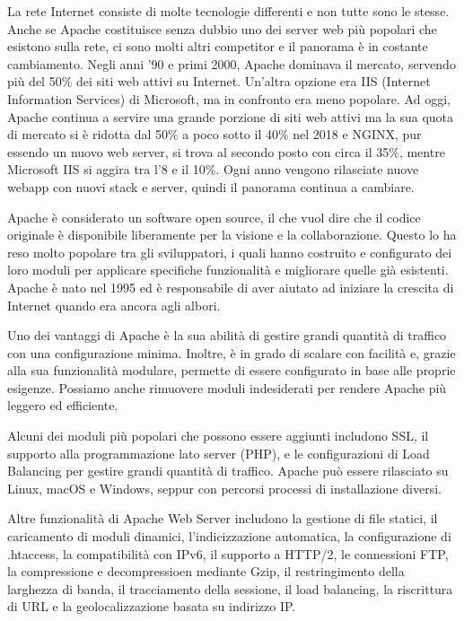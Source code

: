 La rete Internet consiste di molte tecnologie differenti e non tutte sono le stesse. Anche se Apache costituisce senza dubbio uno dei server web più popolari che esistono sulla rete, ci sono molti altri competitor e il panorama è in costante cambiamento. Negli anni '90 e primi 2000, Apache dominava il mercato, servendo più del 50\% dei siti web attivi su Internet. Un'altra opzione era IIS (Internet Information Services) di Microsoft, ma in confronto era meno popolare. Ad oggi, Apache continua a servire una grande porzione di siti web attivi ma la sua quota di mercato si è ridotta dal 50\% a poco sotto il 40\% nel 2018 e NGINX, pur essendo un nuovo web server, si trova al secondo posto con circa il 35\%, mentre Microsoft IIS si aggira tra l'8 e il 10\%. Ogni anno vengono rilasciate nuove webapp con nuovi stack e server, quindi il panorama continua a cambiare.

Apache è considerato un software open source, il che vuol dire che il codice originale è disponibile liberamente per la visione e la collaborazione. Questo lo ha reso molto popolare tra gli sviluppatori, i quali hanno costruito e configurato dei loro moduli per applicare specifiche funzionalità e migliorare quelle già esistenti. Apache è nato nel 1995 ed è responsabile di aver aiutato ad iniziare la crescita di Internet quando era ancora agli albori.

Uno dei vantaggi di Apache è la sua abilità di gestire grandi quantità di traffico con una configurazione minima. Inoltre, è in grado di scalare con facilità e, grazie alla sua funzionalità modulare, permette di essere configurato in base alle proprie esigenze. Possiamo anche rimuovere moduli indesiderati per rendere Apache più leggero ed efficiente.

Alcuni dei moduli più popolari che possono essere aggiunti includono SSL, il supporto alla programmazione lato server (PHP), e le configurazioni di Load Balancing per gestire grandi quantità di traffico. Apache può essere rilasciato su Linux, macOS e Windows, seppur con percorsi processi di installazione diversi.

Altre funzionalità di Apache Web Server includono la gestione di file statici, il caricamento di moduli dinamici, l'indicizzazione automatica, la configurazione di .htaccess, la compatibilità con IPv6, il supporto a HTTP/2, le connessioni FTP, la compressione e decompressioen mediante Gzip, il restringimento della larghezza di banda, il tracciamento della sessione, il load balancing, la riscrittura di URL e la geolocalizzazione basata su indirizzo IP.

